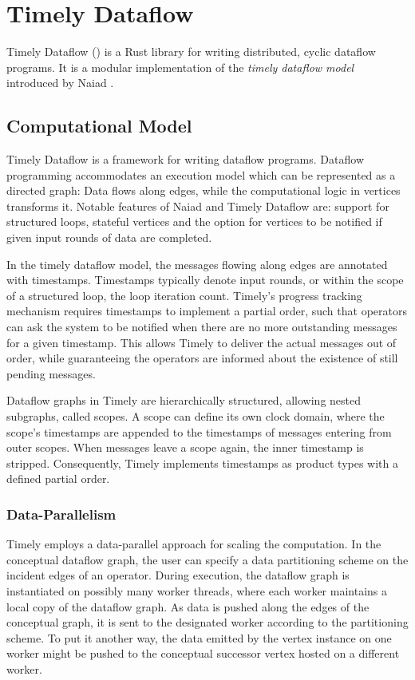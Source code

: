 \chapter{Timely Dataflow}\label{ch:background}

Timely Dataflow \cite{timely} () is a Rust library for writing distributed,
cyclic dataflow programs. It is a modular implementation of the \emph{timely dataflow
model} introduced by Naiad \cite{naiad}. 

\section{Computational Model}
\begin{addedbar}
Timely Dataflow is a framework for writing dataflow programs. Dataflow programming
accommodates an execution model which can be represented as a directed graph:
Data flows along edges, while the computational logic in vertices transforms it.
Notable features of Naiad and Timely Dataflow are: support for structured loops,
stateful vertices and the option for vertices to be notified if given input
rounds of data are completed. \cite{naiad}

In the timely dataflow model, the messages flowing along edges are annotated with
timestamps. Timestamps typically denote input rounds, or within the scope of a
structured loop, the loop iteration count. Timely's progress tracking mechanism requires
timestamps to implement a partial order, such that operators can ask the system
to be notified when there are no more outstanding messages for a given timestamp.
This allows Timely to deliver the actual messages out of order, while 
guaranteeing the operators are informed about the existence of still pending
messages.

Dataflow graphs in Timely are hierarchically structured, allowing
nested subgraphs, called scopes. A scope can define its own clock
domain, where the scope's timestamps are appended to the timestamps of messages
entering from outer scopes. When messages leave a scope again, the inner 
timestamp is stripped. Consequently, Timely implements timestamps
as product types with a defined partial order.

\subsection{Data-Parallelism}

Timely employs a data-parallel approach for scaling the computation. In the
conceptual dataflow graph, the user can specify a data partitioning scheme
on the incident edges of an operator. During execution, the dataflow graph
is instantiated on possibly many worker threads, where each worker maintains
a local copy of the dataflow graph. As data is pushed along the edges of the
conceptual graph, it is sent to the designated worker according to the
partitioning scheme. To put it another way, the data emitted by the vertex
instance on one worker might be pushed to the conceptual successor vertex
hosted on a different worker.


\end{addedbar}
